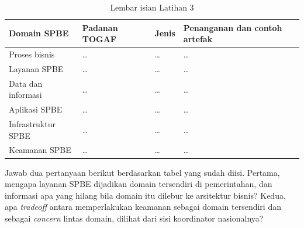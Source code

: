 \begin{table}[!htb]
  \centering
  \caption{Lembar isian Latihan 3}
  \label{tab:ch02-lat3-hasil}
  {\footnotesize
  \begin{tabularx}{\textwidth}{>{\raggedright\arraybackslash}p{2.3cm}
                               >{\raggedright\arraybackslash}p{2.8cm}
                               >{\raggedright\arraybackslash}p{1.7cm}
                               >{\raggedright\arraybackslash}X}
    \hline
    \textbf{Domain SPBE} & \textbf{Padanan TOGAF} & \textbf{Jenis} & \textbf{Penanganan dan contoh artefak} \\
    \hline
    Proses bisnis & \dots & \dots & \dots \\
    \hline
    Layanan SPBE & \dots & \dots & \dots \\
    \hline
    Data dan informasi & \dots & \dots & \dots \\
    \hline
    Aplikasi SPBE & \dots & \dots & \dots \\
    \hline
    Infrastruktur SPBE & \dots & \dots & \dots \\
    \hline
    Keamanan SPBE & \dots & \dots & \dots \\
    \hline
  \end{tabularx}}
\end{table}

Jawab dua pertanyaan berikut berdasarkan tabel yang sudah diisi. Pertama,
mengapa layanan SPBE dijadikan domain tersendiri di pemerintahan, dan
informasi apa yang hilang bila domain itu dilebur ke arsitektur bisnis?
Kedua, apa \textit{tradeoff} antara memperlakukan keamanan sebagai domain
tersendiri dan sebagai \textit{concern} lintas domain, dilihat dari sisi
koordinator nasionalnya?
